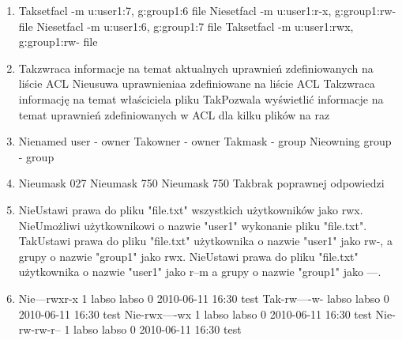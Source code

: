 \begin{enumerate}
	\newpage
	
	\item {}
	{Tak}{setfacl -m u:user1:7, g:group1:6 file}
	{Nie}{setfacl -m u:user1:r-x, g:group1:rw- file}
	{Nie}{setfacl -m u:user1:6, g:group1:7 file}
	{Tak}{setfacl -m u:user1:rwx, g:group1:rw- file}
	
	\item {}
	{Tak}{zwraca informacje na temat aktualnych uprawnień zdefiniowanych na liście ACL}
	{Nie}{usuwa uprawnieniaa zdefiniowane na liście ACL}
	{Tak}{zwraca informację na temat właściciela pliku}
	{Tak}{Pozwala wyświetlić informacje na temat uprawnień zdefiniowanych w ACL dla kilku plików na raz}
	
	\item {}
	{Nie}{named user - owner}
	{Tak}{owner - owner}
	{Tak}{mask - group}
	{Nie}{owning group - group}
	
	\item {}
	{Nie}{umask 027}
	{Nie}{umask 750}
	{Nie}{umask 750}
	{Tak}{brak poprawnej odpowiedzi}
	
	\item {}
	{Nie}{Ustawi prawa do pliku "file.txt" wszystkich użytkowników jako rwx.}
	{Nie}{Umożliwi użytkownikowi o nazwie "user1" wykonanie pliku "file.txt".}
	{Tak}{Ustawi prawa do pliku "file.txt" użytkownika o nazwie "user1" jako rw-, a grupy o nazwie "group1" jako rwx.}
	{Nie}{Ustawi prawa do pliku "file.txt" użytkownika o nazwie "user1" jako r--m a grupy o nazwie "group1" jako ---.}
	
	\item {}
	{Nie}{---rwxr-x 1 labso labso 0 2010-06-11 16:30 test}
	{Tak}{-rw----w- labso labso 0 2010-06-11 16:30 test}
	{Nie}{-rwx----wx 1 labso labso 0 2010-06-11 16:30 test}
	{Nie}{-rw-rw-r-- 1 labso labso 0 2010-06-11 16:30 test}
	

\end{enumerate}
